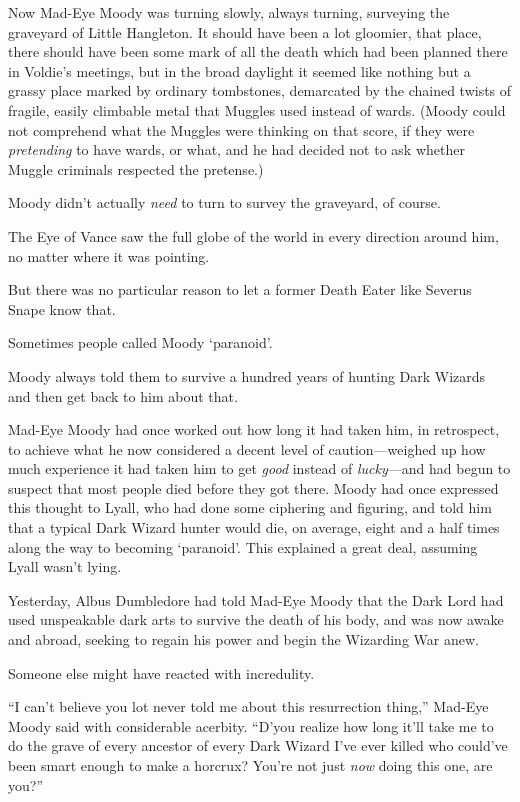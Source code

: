 Now Mad-Eye Moody was turning slowly, always turning, surveying the graveyard of Little Hangleton. It should have been a lot gloomier, that place, there should have been some mark of all the death which had been planned there in Voldie’s meetings, but in the broad daylight it seemed like nothing but a grassy place marked by ordinary tombstones, demarcated by the chained twists of fragile, easily climbable metal that Muggles used instead of wards. (Moody could not comprehend what the Muggles were thinking on that score, if they were \emph{pretending} to have wards, or what, and he had decided not to ask whether Muggle criminals respected the pretense.)

Moody didn’t actually \emph{need} to turn to survey the graveyard, of course.

The Eye of Vance saw the full globe of the world in every direction around him, no matter where it was pointing.

But there was no particular reason to let a former Death Eater like Severus Snape know that.

Sometimes people called Moody ‘paranoid’.

Moody always told them to survive a hundred years of hunting Dark Wizards and then get back to him about that.

Mad-Eye Moody had once worked out how long it had taken him, in retrospect, to achieve what he now considered a decent level of caution—weighed up how much experience it had taken him to get \emph{good} instead of \emph{lucky}—and had begun to suspect that most people died before they got there. Moody had once expressed this thought to Lyall, who had done some ciphering and figuring, and told him that a typical Dark Wizard hunter would die, on average, eight and a half times along the way to becoming ‘paranoid’. This explained a great deal, assuming Lyall wasn’t lying.

Yesterday, Albus Dumbledore had told Mad-Eye Moody that the Dark Lord had used unspeakable dark arts to survive the death of his body, and was now awake and abroad, seeking to regain his power and begin the Wizarding War anew.

Someone else might have reacted with incredulity.

“I can’t believe you lot never told me about this resurrection thing,” Mad-Eye Moody said with considerable acerbity. “D’you realize how long it’ll take me to do the grave of every ancestor of every Dark Wizard I’ve ever killed who could’ve been smart enough to make a horcrux? You’re not just \emph{now} doing this one, are you?”

